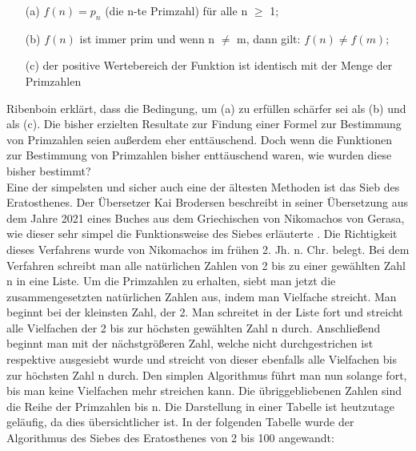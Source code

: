 \begin{itemize}
\item[ (a) ]  $f(n) = p_n$ (die n-te Primzahl) für alle n $\geq$ 1;
\item[ (b) ]  $f(n)$ ist immer prim und wenn n $\neq$ m, dann gilt: $f(n) \neq f(m)$;
\item[ (c) ]  der positive Wertebereich der Funktion ist identisch mit der Menge der Primzahlen
\end{itemize}

Ribenboin erklärt, dass die Bedingung, um (a) zu erfüllen schärfer sei als (b) und als (c). Die bisher erzielten Resultate zur Findung einer Formel zur Bestimmung von Primzahlen seien außerdem eher enttäuschend. Doch wenn die Funktionen zur Bestimmung von Primzahlen bisher enttäuschend waren, wie wurden diese bisher bestimmt?\\

Eine der simpelsten und sicher auch eine der ältesten Methoden ist das \glqq Sieb des Eratosthenes\grqq . Der Übersetzer Kai Brodersen beschreibt in seiner Übersetzung aus dem Jahre 2021 eines Buches aus dem Griechischen von Nikomachos von Gerasa, wie dieser sehr simpel die Funktionsweise des Siebes erläuterte \cite[vgl.][S. 7]{Nikomachos+2021+7+7}. Die Richtigkeit dieses Verfahrens wurde von Nikomachos im frühen 2. Jh. n. Chr. belegt. Bei dem Verfahren schreibt man alle natürlichen Zahlen von 2 bis zu einer gewählten Zahl n in eine Liste. Um die Primzahlen zu erhalten, siebt man jetzt die zusammengesetzten natürlichen Zahlen aus, indem man Vielfache streicht. Man beginnt bei der kleinsten Zahl, der 2. Man schreitet in der Liste fort und streicht alle Vielfachen der 2 bis zur höchsten gewählten Zahl n durch. Anschließend beginnt man mit der nächstgrößeren Zahl, welche nicht durchgestrichen ist respektive ausgesiebt wurde und streicht von dieser ebenfalls alle Vielfachen bis zur höchsten Zahl n durch. Den simplen Algorithmus führt man nun solange fort, bis man keine Vielfachen mehr streichen kann. Die übriggebliebenen Zahlen sind die Reihe der Primzahlen bis n. Die Darstellung in einer Tabelle ist heutzutage geläufig, da dies übersichtlicher ist. In der folgenden Tabelle wurde der Algorithmus des Siebes des Eratosthenes von 2 bis 100 angewandt:\\

